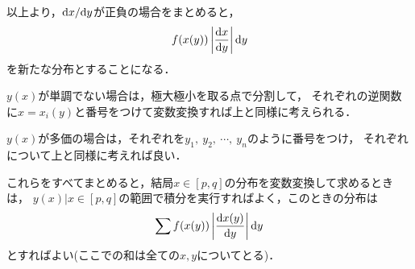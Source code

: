 \documentclass[a4paper,12pt]{jsarticle}
\newcommand{\dif}[2]{\frac{{\rm d} #1}{{\rm d} #2}}
\begin{document}
以上より，${\rm d}x/{\rm d}y$が正負の場合をまとめると，
\begin{equation}
	f(x(y)) \left| \dif{x}{y} \right| {\rm d}y
\end{equation}
を新たな分布とすることになる．

$y(x)$が単調でない場合は，極大極小を取る点で分割して，
それぞれの逆関数に$x = x_i (y)$と番号をつけて変数変換すれば上と同様に考えられる．

$y(x)$が多価の場合は，それぞれを$y_1,\ y_2,\ \cdots,\ y_n$のように番号をつけ，
それぞれについて上と同様に考えれば良い．

これらをすべてまとめると，結局$x \in [p, q]$の分布を変数変換して求めるときは，
${y(x) | x \in [p, q]}$の範囲で積分を実行すればよく，このときの分布は
\begin{equation}
	\sum f(x(y)) \left| \dif{x(y)}{y} \right| {\rm d}y
\end{equation}
とすればよい(ここでの和は全ての$x, y$についてとる)．
\end{document}
